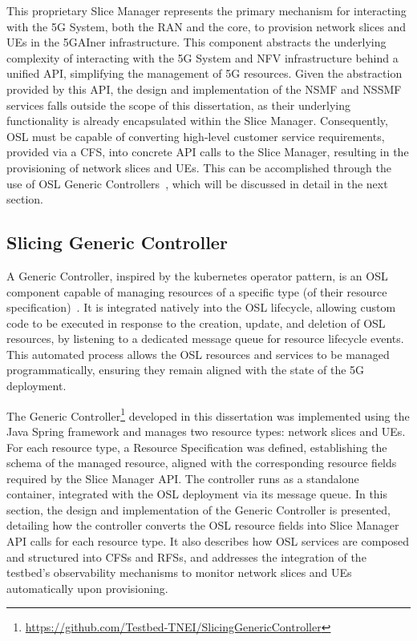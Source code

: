 This proprietary Slice Manager represents the primary mechanism for interacting with the \acs{5G} System, both the \acs{RAN} and the core, to provision network slices and \acsp{UE} in the 5GAIner infrastructure. This component abstracts the underlying complexity of interacting with the \acs{5G} System and \acs{NFV} infrastructure behind a unified \acs{API}, simplifying the management of \acs{5G} resources. Given the abstraction provided by this \acs{API}, the design and implementation of the \acs{NSMF} and \acs{NSSMF} services falls outside the scope of this dissertation, as their underlying functionality is already encapsulated within the Slice Manager. Consequently, \acs{OSL} must be capable of converting high-level customer service requirements, provided via a \acs{CFS}, into concrete \acs{API} calls to the Slice Manager, resulting in the provisioning of network slices and \acsp{UE}. This can be accomplished through the use of \acs{OSL} Generic Controllers~\cite{OpenSliceGenericServicesController}, which will be discussed in detail in the next section.

\subsection{Slicing Generic Controller}
\label{chap:impl:resource_lifecycle:controller}

A Generic Controller, inspired by the kubernetes operator pattern, is an \acs{OSL} component capable of managing resources of a specific type (of their resource specification)~\cite{OpenSliceGenericServicesController}. It is integrated natively into the \acs{OSL} lifecycle, allowing custom code to be executed in response to the creation, update, and deletion of \acs{OSL} resources, by listening to a dedicated message queue for resource lifecycle events. This automated process allows the \acs{OSL} resources and services to be managed programmatically, ensuring they remain aligned with the state of the \acs{5G} deployment.

The Generic Controller\footnote{\url{https://github.com/Testbed-TNEI/SlicingGenericController}} developed in this dissertation was implemented using the Java Spring framework and manages two resource types: network slices and \acsp{UE}. For each resource type, a Resource Specification was defined, establishing the schema of the managed resource, aligned with the corresponding resource fields required by the Slice Manager \acs{API}. The controller runs as a standalone container, integrated with the \acs{OSL} deployment via its message queue. In this section, the design and implementation of the Generic Controller is presented, detailing how the controller converts the \acs{OSL} resource fields into Slice Manager \acs{API} calls for each resource type. It also describes how \acs{OSL} services are composed and structured into \acsp{CFS} and \acsp{RFS}, and addresses the integration of the testbed's observability mechanisms to monitor network slices and \acsp{UE} automatically upon provisioning.

